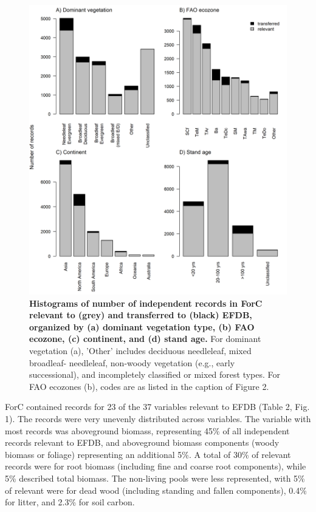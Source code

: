 \documentclass[, manuscript]{copernicus}
\begin{document}
\newpage
\begin{figure}
\includegraphics[width=15cm]{figures_tables/Histogram_n_Relevant_and_Transferred_Records} \caption{\textbf{Histograms of number of independent records in ForC relevant to (grey) and transferred to (black) EFDB, organized by (a) dominant vegetation type, (b) FAO ecozone, (c) continent, and (d) stand age.} For dominant vegetation (a), 'Other' includes deciduous needleleaf, mixed broadleaf- needleleaf, non-woody vegetation (e.g., early successional), and incompletely classified or mixed forest types. For FAO ecozones (b), codes are as listed in the caption of Figure 2.}\label{fig:fig_histograms}
\end{figure}

ForC contained records for 23 of the 37 variables relevant to EFDB
(Table 2, Fig. 1). The records were very unevenly distributed across
variables. The variable with most records was aboveground biomass,
representing 45\% of all independent records relevant to EFDB, and
aboveground biomass components (woody biomass or foliage) representing
an additional 5\%. A total of 30\% of relevant records were for root
biomass (including fine and coarse root components), while 5\% described
total biomass. The non-living pools were less represented, with 5\% of
relevant were for dead wood (including standing and fallen components),
0.4\% for litter, and 2.3\% for soil carbon.
\end{document}
